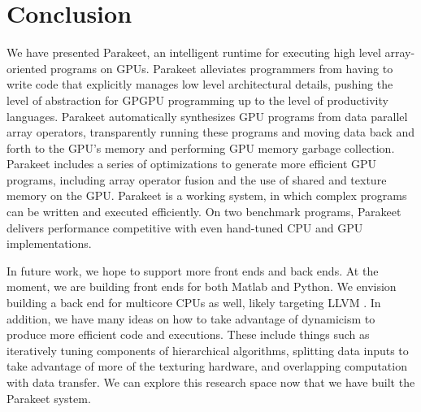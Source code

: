 \documentclass[preprint]{sigplanconf}
\begin{document}
\section{Conclusion}
\label{Conclusion}

We have presented Parakeet, an intelligent runtime for executing high level
array-oriented programs on GPUs.  Parakeet alleviates programmers from having
to write code that explicitly manages low level architectural details, pushing
the level of abstraction for GPGPU programming up to the level of productivity
languages.  Parakeet automatically synthesizes GPU programs from data parallel
array operators, transparently running these programs and moving data back and
forth to the GPU's memory and performing GPU memory garbage collection.
Parakeet includes a series of optimizations to generate more efficient GPU
programs, including array operator fusion and the use of shared and texture
memory on the GPU.  Parakeet is a working system, in which complex programs can
be written and executed efficiently.  On two benchmark programs, Parakeet
delivers performance competitive with even hand-tuned CPU and GPU
implementations.

In future work, we hope to support more front ends and back ends.  At the
moment, we are building front ends for both Matlab and Python.  We envision
building a back end for multicore CPUs as well, likely targeting LLVM
\cite{Latt02}.  In addition, we have many ideas on how to take advantage of
dynamicism to produce more efficient code and executions.  These include things
such as iteratively tuning components of hierarchical algorithms, splitting
data inputs to take advantage of more of the texturing hardware, and overlapping
computation with data transfer.  We can explore this research space now that
we have built the Parakeet system.


{}
\end{document}
